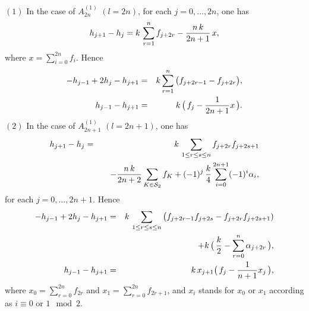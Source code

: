 \begin{prop}
$(1)$ In the case of $A^{(1)}_{2n}$ $(l=2n)$, for each $j=0,\ldots,2n$, one has 
\begin{equation}\Label{h-dif-2n}
h_{j+1}-h_j= k\,\sum_{r=1}^{n} f_{j+2r}-\frac{n\,k}{2n+1}\,x,
\end{equation}
where $x=\sum_{i=0}^{2n} f_i$.  Hence
\begin{eqnarray}\Label{h-2n}
-h_{j-1}+2h_j-h_{j+1}&=&k\sum_{r=1}^n \big(f_{j+2r-1}-f_{j+2r}\big),\\
h_{j-1}-h_{j+1}&=&k\, \big(\,f_j-\frac{1}{2n+1} x\,\big). \notag
\end{eqnarray}
$(2)$ In the case of $A^{(1)}_{2n+1}$ $(l=2n+1)$, one has
\begin{eqnarray}\Label{h-dif-2n+1}
h_{j+1}-h_j&=& k\,\sum_{1\le r\le s\le n} f_{j+2r} f_{j+2s+1}\\
&&\quad -\frac{n\,k}{2n+2}\sum_{K\in{\cal S}_2}f_K+
(-1)^j\,\frac{k}{4}\sum_{i=0}^{2n+1}(-1)^{i}\alpha_i,\notag 
\end{eqnarray}
for each $j=0,\ldots,2n+1$. 
Hence
\begin{eqnarray}\Label{h-2n+1}
-h_{j-1}+2h_j-h_{j+1}&=&
k\,\sum_{1\le r\le s\le n}\big(f_{j+2r-1} f_{j+2s}-f_{j+2r} f_{j+2s+1})\\
&& \quad +k\,\big(\,\frac{k}{2}-\sum_{r=0}^n \alpha_{j+2r}\,\big),\notag\\
h_{j-1}-h_{j+1}&=&k \, x_{j+1}\big(\,f_j-\frac{1}{n+1} x_j\,\big), \notag
\end{eqnarray}
where $x_0=\sum_{r=0}^{2n} f_{2r}$ and $x_1=\sum_{r=0}^{2n} f_{2r+1}$,
and $x_i$ stands for $x_0$ or $x_1$ according as $i\equiv 0$ or $1 \mod 2$. 
\end{prop}
